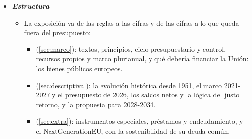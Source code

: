 \documentclass[11pt]{article}
\begin{document}
\begin{itemize}
\item \textbf{\emph{Estructura}}:
  \begin{itemize}
  \item La exposición va de las reglas a las cifras y de las cifras a lo que queda fuera del presupuesto:
    \begin{itemize}
    \item {} (\ref{sec:marco}): textos, principios, ciclo presupuestario y control, recursos propios y marco plurianual, y qué debería financiar la Unión: los bienes públicos europeos.
    \item {} (\ref{sec:descriptiva}): la evolución histórica desde 1951, el marco 2021-2027 y el presupuesto de 2026, los saldos netos y la lógica del justo retorno, y la propuesta para 2028-2034.
    \item {} (\ref{sec:extra}): instrumentos especiales, préstamos y endeudamiento, y el NextGenerationEU, con la sostenibilidad de su deuda común.
    \end{itemize}
  \end{itemize}
\end{itemize}
\end{document}
